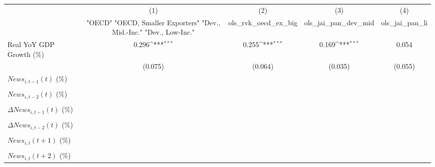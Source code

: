 {
\def\sym#1{\ifmmode^{#1}\else\(^{#1}\)\fi}
\begin{tabular}{l*{4}{c}}
\toprule
                    &\multicolumn{1}{c}{(1)}&\multicolumn{1}{c}{(2)}&\multicolumn{1}{c}{(3)}&\multicolumn{1}{c}{(4)}\\
                    &\multicolumn{1}{c}{ "OECD" "OECD, Smaller Exporters" "Dev., Mid.-Inc." "Dev., Low-Inc."}&\multicolumn{1}{c}{ols_rvk_oecd_ex_big}&\multicolumn{1}{c}{ols_jai_pan_dev_mid}&\multicolumn{1}{c}{ols_jai_pan_li}\\
\midrule
Real YoY GDP Growth (\%)&       0.296\sym{***}&       0.255\sym{***}&       0.169\sym{***}&       0.054         \\
                    &     (0.075)         &     (0.064)         &     (0.035)         &     (0.055)         \\
\addlinespace
$ News_{i,t-1}(t)$ (\%)&                     &                     &                     &                     \\
                    &                     &                     &                     &                     \\
\addlinespace
$ News_{i,t-2}(t)$ (\%)&                     &                     &                     &                     \\
                    &                     &                     &                     &                     \\
\addlinespace
$ \Delta News_{i,t-1}(t)$ (\%)&                     &                     &                     &                     \\
                    &                     &                     &                     &                     \\
\addlinespace
$ \Delta News_{i,t-2}(t)$ (\%)&                     &                     &                     &                     \\
                    &                     &                     &                     &                     \\
\addlinespace
$ News_{i,t}(t+1)$ (\%)&                     &                     &                     &                     \\
                    &                     &                     &                     &                     \\
\addlinespace
$ News_{i,t}(t+2)$ (\%)&                     &                     &                     &                     \\

\end{tabular}}
